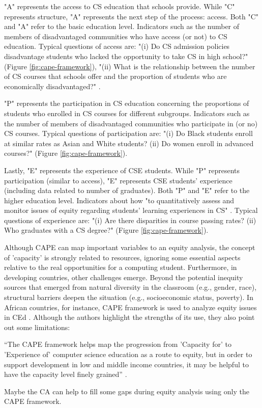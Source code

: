 "A" represents the access to \gls{CS} education that schools provide. While "C" represents structure, "A" represents the next step of the process: access. Both "C" and "A" refer to the basic education level. Indicators such as the number of members of disadvantaged communities who have access (or not) to \gls{CS} education. Typical questions of access are: "(i) Do \gls{CS} admission policies disadvantage students who lacked the opportunity to take \gls{CS} in high school?" (Figure \ref{fig:cape-framework}), "(ii) What is the relationship between the number of \gls{CS} courses that schools offer and the proportion of students who are economically disadvantaged?" \cite[p.~10]{warner:2022}.

"P" represents the participation in \gls{CS} education concerning the proportions of students who enrolled in \gls{CS} courses for different subgroups. Indicators such as the number of members of disadvantaged communities who participate in (or no) \gls{CS} courses. Typical questions of participation are: "(i) Do Black students enroll at similar rates as Asian and White students? (ii) Do women enroll in advanced courses?" (Figure \ref{fig:cape-framework}). 

Lastly, "E" represents the experience of \gls{CSE} students. While "P" represents participation (similar to access), "E" represents \gls{CSE} students' experience (including data related to number of graduates). Both "P" and "E" refer to the higher education level. Indicators about how "to quantitatively assess and monitor issues of equity regarding students’ learning experiences in \gls{CS}" \cite[p.~5]{warner:2022}. Typical questions of experience are: "(i) Are there disparities in course passing rates? (ii) Who graduates with a \gls{CS} degree?" (Figure \ref{fig:cape-framework}).

Although \gls{CAPE} can map important variables to an equity analysis, the concept
of 'capacity' is strongly related to resources, ignoring some essential aspects relative to the real opportunities for a computing student. Furthermore, in developing countries, other challenges emerge. Beyond the potential inequity sources that emerged from natural diversity in the classroom (e.g., gender, race), structural barriers deepen the situation (e.g., socioeconomic status, poverty). In African countries, for instance, \gls{CAPE} framework is used to analyze equity issues in \gls{CEd} \cite{tshukudu:2023}. Although the authors highlight the strengths of its use, they also point out some limitations: 
\begin{citacao}
    ``The \gls{CAPE} framework helps map the progression from 'Capacity for' to 'Experience of' computer science education as a route to equity, but in order to support development in low and middle income countries, it may be helpful to have the capacity level finely grained'' \cite[p.~1]{tshukudu:2023}.
\end{citacao}
Maybe the \gls{CA} can help to fill some gaps during equity analysis using only the \gls{CAPE} framework. 